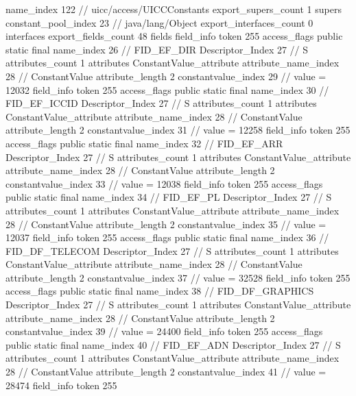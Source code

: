 {{{			name_index	122		// uicc/access/UICCConstants
			export_supers_count	1
			supers {
				constant_pool_index	23		// java/lang/Object
			}
			export_interfaces_count	0
			interfaces {
			}
			export_fields_count	48
			fields {
			field_info {
				token	255
				access_flags	public static final
				name_index	26		// FID_EF_DIR
				Descriptor_Index	27		// S
				attributes_count	1
				attributes {
				ConstantValue_attribute {
					attribute_name_index	28		// ConstantValue
					attribute_length	2
					constantvalue_index	29		// value = 12032
				}
				}
			}
			field_info {
				token	255
				access_flags	public static final
				name_index	30		// FID_EF_ICCID
				Descriptor_Index	27		// S
				attributes_count	1
				attributes {
				ConstantValue_attribute {
					attribute_name_index	28		// ConstantValue
					attribute_length	2
					constantvalue_index	31		// value = 12258
				}
				}
			}
			field_info {
				token	255
				access_flags	public static final
				name_index	32		// FID_EF_ARR
				Descriptor_Index	27		// S
				attributes_count	1
				attributes {
				ConstantValue_attribute {
					attribute_name_index	28		// ConstantValue
					attribute_length	2
					constantvalue_index	33		// value = 12038
				}
				}
			}
			field_info {
				token	255
				access_flags	public static final
				name_index	34		// FID_EF_PL
				Descriptor_Index	27		// S
				attributes_count	1
				attributes {
				ConstantValue_attribute {
					attribute_name_index	28		// ConstantValue
					attribute_length	2
					constantvalue_index	35		// value = 12037
				}
				}
			}
			field_info {
				token	255
				access_flags	public static final
				name_index	36		// FID_DF_TELECOM
				Descriptor_Index	27		// S
				attributes_count	1
				attributes {
				ConstantValue_attribute {
					attribute_name_index	28		// ConstantValue
					attribute_length	2
					constantvalue_index	37		// value = 32528
				}
				}
			}
			field_info {
				token	255
				access_flags	public static final
				name_index	38		// FID_DF_GRAPHICS
				Descriptor_Index	27		// S
				attributes_count	1
				attributes {
				ConstantValue_attribute {
					attribute_name_index	28		// ConstantValue
					attribute_length	2
					constantvalue_index	39		// value = 24400
				}
				}
			}
			field_info {
				token	255
				access_flags	public static final
				name_index	40		// FID_EF_ADN
				Descriptor_Index	27		// S
				attributes_count	1
				attributes {
				ConstantValue_attribute {
					attribute_name_index	28		// ConstantValue
					attribute_length	2
					constantvalue_index	41		// value = 28474
				}
				}
			}
			field_info {
				token	255
}}}}}
